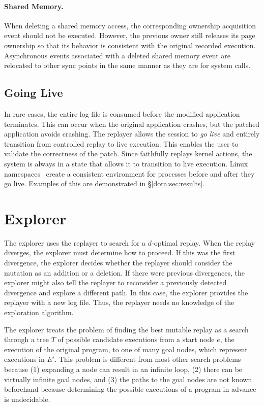 \paragraph{Shared Memory.}
When deleting a shared memory access, the corresponding ownership
acquisition event should not be executed.  However, the previous owner
still releases its page ownership so that its behavior is consistent
with the original recorded execution. Asynchronous events associated with a
deleted shared memory event are relocated to other sync points in the same
manner as they are for system calls.

\subsection{Going Live}
In rare cases, the entire log file is
consumed before the modified application terminates. This can occur when the
original application crashes, but the patched application avoids crashing. The
replayer allows the session to \emph{go live} and entirely transition from
controlled replay to live execution. This enables the user to
validate the correctness of the patch.
Since {\dora} faithfully replays kernel actions, the system is always in a state that allows
it to transition to live execution. Linux namespaces~\cite{namespaces:linux06}
create a consistent environment for processes before and after they go live.
Examples of this are demonstrated in \S\ref{dora:sec:results}.

\section{Explorer}
\label{dora:sec:explorer}

The explorer uses the replayer to search for a $d$-optimal replay. When the
replay diverges, the explorer must determine how to proceed.
If this was the first divergence, the
explorer decides whether the replayer should consider the mutation as
an addition or a deletion. If there were previous divergences, the
explorer might also tell the replayer to reconsider a previously
detected divergence and explore a different path. In this case, the
explorer provides the replayer with a new log file.  Thus, the 
replayer needs no knowledge of the exploration algorithm.

The explorer treats the problem of finding the best mutable replay as
a search through a tree $T$ of possible candidate executions from a
start node $e$, the execution of the original program, to one of
many goal nodes, which represent executions in $E'$.
This problem is different from most other search problems because
(1) expanding a node can result in an infinite loop,
(2) there can be virtually infinite goal nodes, and
(3) the paths to the
goal nodes are not known beforehand because determining the possible
executions of a program in advance is undecidable.

